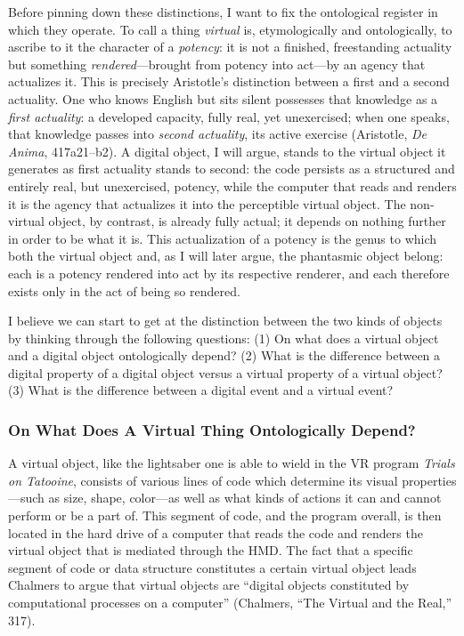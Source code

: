 \documentclass{article}
\begin{document}
Before pinning down these distinctions, I want to fix the ontological register in which they operate. To call a thing \textit{virtual} is, etymologically and ontologically, to ascribe to it the character of a \textit{potency}: it is not a finished, freestanding actuality but something \textit{rendered}—brought from potency into act—by an agency that actualizes it. This is precisely Aristotle's distinction between a first and a second actuality. One who knows English but sits silent possesses that knowledge as a \textit{first actuality}: a developed capacity, fully real, yet unexercised; when one speaks, that knowledge passes into \textit{second actuality}, its active exercise (Aristotle, \textit{De Anima}, 417a21–b2). A digital object, I will argue, stands to the virtual object it generates as first actuality stands to second: the code persists as a structured and entirely real, but unexercised, potency, while the computer that reads and renders it is the agency that actualizes it into the perceptible virtual object. The non-virtual object, by contrast, is already fully actual; it depends on nothing further in order to be what it is. This actualization of a potency is the genus to which both the virtual object and, as I will later argue, the phantasmic object belong: each is a potency rendered into act by its respective renderer, and each therefore exists only in the act of being so rendered.

I believe we can start to get at the distinction between the two kinds of objects by thinking through the following questions: (1) On what does a virtual object and a digital object ontologically depend? (2) What is the difference between a digital property of a digital object versus a virtual property of a virtual object? (3) What is the difference between a digital event and a virtual event?

\subsubsection*{On What Does A Virtual Thing Ontologically Depend?}

A virtual object, like the lightsaber one is able to wield in the VR program \textit{Trials on Tatooine}, consists of various lines of code which determine its visual properties—such as size, shape, color—as well as what kinds of actions it can and cannot perform or be a part of. This segment of code, and the program overall, is then located in the hard drive of a computer that reads the code and renders the virtual object that is mediated through the HMD. The fact that a specific segment of code or data structure constitutes a certain virtual object leads Chalmers to argue that virtual objects are “digital objects constituted by computational processes on a computer” (Chalmers, “The Virtual and the Real,” 317).
\end{document}
